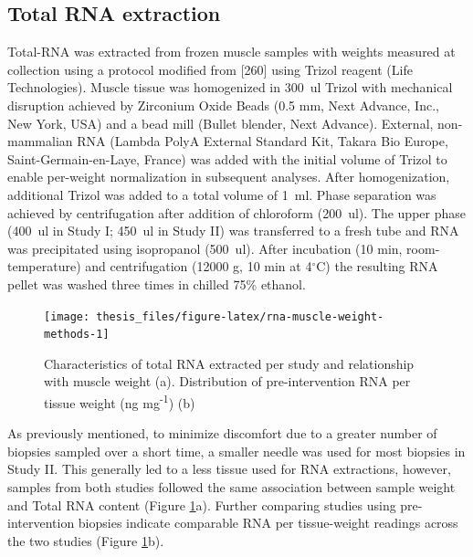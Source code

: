 \documentclass[twoside,10pt]{gihclass} %
\begin{document}
\hypertarget{total-rna-extraction}{%
\subsection{Total RNA extraction}\label{total-rna-extraction}}

Total-RNA was extracted from frozen muscle samples with weights measured at collection using a protocol modified from
{[}260{]}
using Trizol reagent (Life Technologies).
Muscle tissue was homogenized in \SI{300}{ul} Trizol with mechanical disruption achieved by Zirconium Oxide Beads (0.5 mm, Next Advance, Inc., New York, USA) and a bead mill (Bullet blender, Next Advance). External, non-mammalian RNA (Lambda PolyA External Standard Kit, Takara Bio Europe, Saint-Germain-en-Laye, France) was added with the initial volume of Trizol to enable per-weight normalization in subsequent analyses. After homogenization, additional Trizol was added to a total volume of \SI{1}{ml}. Phase separation was achieved by centrifugation after addition of chloroform (\SI{200}{ul}). The upper phase (\SI{400}{ul} in Study I; \SI{450}{ul} in Study II) was transferred to a fresh tube and RNA was precipitated using isopropanol (\SI{500}{ul}). After incubation (10 min, room-temperature) and centrifugation (12000 g, 10 min at 4\(^{\circ}\)C) the resulting RNA pellet was washed three times in chilled 75\% ethanol.
\begin{figure}

{\centering \texttt{[image: thesis\_files/figure-latex/rna-muscle-weight-methods-1]} 

}

\caption[Characteristics of total RNA extracted per study]{Characteristics of total RNA extracted per study and relationship with muscle weight (a). Distribution of pre-intervention RNA per tissue weight (ng mg\textsuperscript{-1}) (b)}\label{fig:rna-muscle-weight-methods}
\end{figure}
As previously mentioned, to minimize discomfort due to a greater number of biopsies sampled over a short time, a smaller needle was used for most biopsies in Study II. This generally led to a less tissue used for RNA extractions, however, samples from both studies followed the same association between sample weight and Total RNA content (Figure \ref{fig:rna-muscle-weight-methods}a). Further comparing studies using pre-intervention biopsies indicate comparable RNA per tissue-weight readings across the two studies (Figure \ref{fig:rna-muscle-weight-methods}b).
\end{document}
